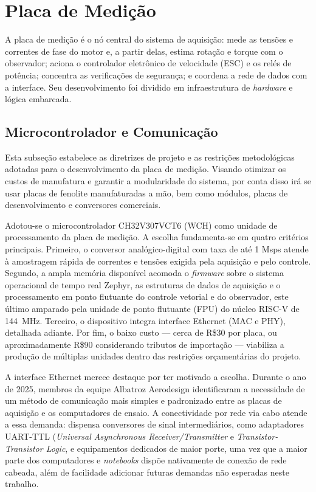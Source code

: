 \section{Placa de Medição}
\label{sec:siba}
\label{sec:placa_medicao}
A placa de medição é o nó central do sistema de aquisição: mede as
tensões e correntes de fase do motor e, a partir delas, estima rotação e torque
com o observador; aciona o controlador eletrônico de velocidade (ESC) e os
relés de potência; concentra as verificações de segurança; e coordena a rede de
dados com a interface. Seu desenvolvimento foi dividido em infraestrutura de
\textit{hardware} e lógica embarcada.

\subsection{Microcontrolador e Comunicação}
\label{sec:padronizacao_placas}
Esta subseção estabelece as diretrizes de projeto e as restrições metodológicas adotadas para o desenvolvimento da placa de medição. Visando otimizar os custos de manufatura e garantir a modularidade do sistema, por conta disso irá se usar placas de fenolite manufaturadas a mão, bem como módulos, placas de desenvolvimento e conversores comerciais.

Adotou-se o microcontrolador CH32V307VCT6 (WCH) como unidade de processamento
da placa de medição. A escolha fundamenta-se em quatro critérios principais.
Primeiro, o conversor analógico-digital com taxa de até 1 Msps
atende à amostragem rápida de correntes e tensões exigida pela aquisição e pelo
controle. Segundo, a ampla memória disponível acomoda o \textit{firmware} sobre
o sistema operacional de tempo real Zephyr, as estruturas de dados de aquisição
e o processamento em ponto flutuante do controle vetorial e do observador, este
último amparado pela unidade de ponto flutuante (FPU) do núcleo RISC-V de
\SI{144}{\mega\hertz}. Terceiro, o dispositivo integra interface Ethernet
(MAC e PHY), detalhada adiante. Por fim, o baixo custo — cerca de
R\$30 por placa, ou aproximadamente R\$90 considerando
tributos de importação — viabiliza a produção de múltiplas unidades dentro das
restrições orçamentárias do projeto.

A interface Ethernet merece destaque por ter motivado a escolha. Durante o ano
de 2025, membros da equipe Albatroz Aerodesign identificaram a necessidade de um
método de comunicação mais simples e padronizado entre as placas de aquisição e
os computadores de ensaio. A conectividade por rede via cabo atende a essa
demanda: dispensa conversores de sinal intermediários, como adaptadores
UART-TTL (\textit{Universal Asynchronous Receiver/Transmitter} e \textit{Transistor-Transistor Logic}, e equipamentos dedicados de maior porte, uma vez que a maior parte dos
computadores e \textit{notebooks} dispõe nativamente de conexão de rede cabeada, além de facilidade adicionar futuras demandas não esperadas neste trabalho.

